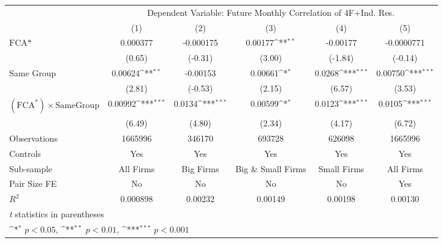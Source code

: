 {
\def\sym#1{\ifmmode^{#1}\else\(^{#1}\)\fi}
\begin{tabular}{l*{5}{c}}
\hline\hline
                &\multicolumn{5}{c}{Dependent Variable: Future Monthly Correlation of 4F+Ind. Res.}            \\\cmidrule(lr){2-6}
                &\multicolumn{1}{c}{(1)}         &\multicolumn{1}{c}{(2)}         &\multicolumn{1}{c}{(3)}         &\multicolumn{1}{c}{(4)}         &\multicolumn{1}{c}{(5)}         \\
\hline
$ \text{FCA*} $ & 0.000377         &-0.000175         &  0.00177\sym{**} & -0.00177         &-0.0000771         \\
                &   (0.65)         &  (-0.31)         &   (3.00)         &  (-1.84)         &  (-0.14)         \\
[1em]
Same Group      &  0.00624\sym{**} & -0.00153         &  0.00661\sym{*}  &   0.0268\sym{***}&  0.00750\sym{***}\\
                &   (2.81)         &  (-0.53)         &   (2.15)         &   (6.57)         &   (3.53)         \\
[1em]
 $ (\text{FCA}^*) \times {\text{SameGroup} }  $ &  0.00992\sym{***}&   0.0134\sym{***}&  0.00599\sym{*}  &   0.0123\sym{***}&   0.0105\sym{***}\\
                &   (6.49)         &   (4.80)         &   (2.34)         &   (4.17)         &   (6.72)         \\
\hline
Observations    &  1665996         &   346170         &   693728         &   626098         &  1665996         \\
Controls        &      Yes         &      Yes         &      Yes         &      Yes         &      Yes         \\
Sub-sample      &All Firms         &Big Firms         &Big \& Small Firms         &Small Firms         &All Firms         \\
Pair Size FE    &       No         &       No         &       No         &       No         &      Yes         \\
$ R^2 $         & 0.000898         &  0.00232         &  0.00149         &  0.00198         &  0.00130         \\
\hline\hline
\multicolumn{6}{l}{\footnotesize \textit{t} statistics in parentheses}\\
\multicolumn{6}{l}{\footnotesize \sym{*} \(p<0.05\), \sym{**} \(p<0.01\), \sym{***} \(p<0.001\)}\\
\end{tabular}
}

